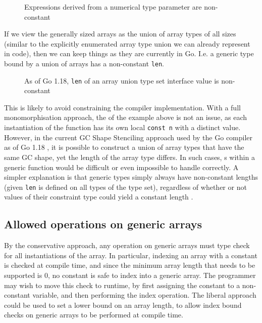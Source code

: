\begin{figure}
    \caption{Expressions derived from a numerical type parameter are non-constant}
\end{figure}

If we view the generally sized arrays as the union of array types of all sizes
(similar to the explicitly enumerated array type union we can already represent
in code), then we can keep things as they are currently in Go. I.e. a generic
type bound by a union of arrays has a non-constant \texttt{len}.

\begin{figure}
    \caption{As of Go 1.18, \texttt{len} of an array union type set interface
        value is non-constant}
\end{figure}

This is likely to avoid constraining the compiler implementation. With a full
monomorphisation approach, the  of the example above is not an issue,
as each instantiation of the function has its own local \texttt{const n} with a
distinct value. However, in the current GC Shape Stenciling approach used by the
Go compiler as of Go 1.18 \autocite{generics1.18}, it is possible to construct a
union of array types that have the same GC shape, yet the length of the array
type differs. In such cases, s within a generic function would be
difficult or even impossible to handle correctly. A simpler explanation is that
generic types simply always have non-constant lengths (given \texttt{len} is
defined on all types of the type set), regardless of whether or not values of
their constraint type could yield a constant length \autocite{spec}.

\subsection{Allowed operations on generic arrays}

By the conservative approach, any operation on generic arrays must type check
for all instantiations of the array. In particular, indexing an array with a
constant is checked at compile time, and since the minimum array length that
needs to be supported is 0, no constant is safe to index into a generic array.
The programmer may wish to move this check to runtime, by first assigning the
constant to a non-constant  variable, and then performing the index
operation. The liberal approach could be used to set a lower bound on an array
length, to allow index bound checks on generic arrays to be performed at
compile time.

